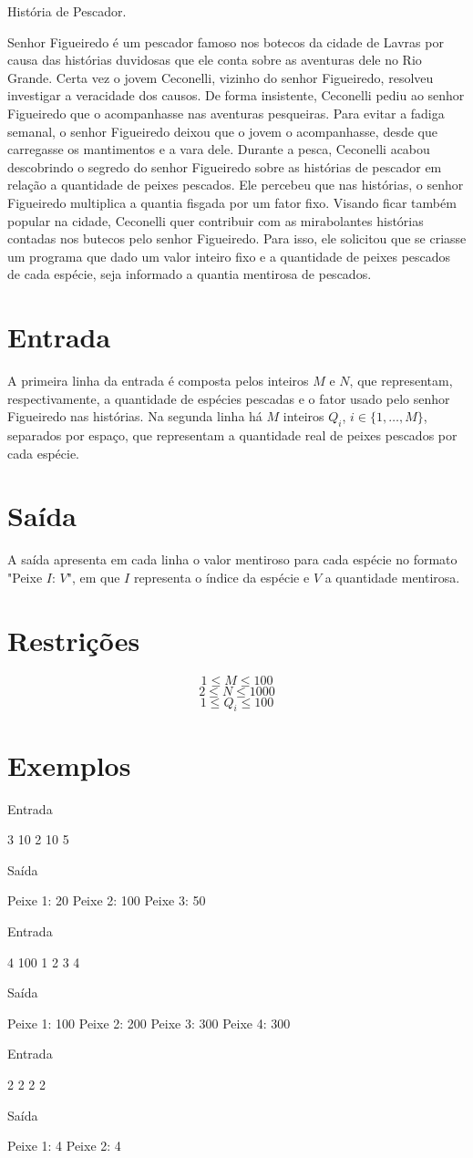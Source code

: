 História de Pescador.

Senhor Figueiredo é um pescador famoso nos botecos da cidade de Lavras por causa das histórias duvidosas que ele conta sobre as aventuras dele no Rio Grande. Certa vez o jovem Ceconelli, vizinho do senhor Figueiredo, resolveu investigar a veracidade dos causos. De forma insistente, Ceconelli pediu ao senhor Figueiredo que o acompanhasse nas aventuras pesqueiras. Para evitar a fadiga semanal, o senhor Figueiredo deixou que o jovem o acompanhasse, desde que carregasse os mantimentos e a vara dele. Durante a pesca, Ceconelli acabou descobrindo o segredo do senhor Figueiredo sobre as histórias de pescador em relação a quantidade de peixes pescados. Ele percebeu que nas histórias, o senhor Figueiredo multiplica a quantia fisgada por um fator fixo. Visando ficar também popular na cidade, Ceconelli quer contribuir com as mirabolantes histórias contadas nos butecos pelo senhor Figueiredo. Para isso, ele solicitou que se criasse um programa que dado um valor inteiro fixo e a quantidade de peixes pescados de cada espécie, seja informado a quantia mentirosa de pescados.

\section*{Entrada}

A primeira linha da entrada é composta pelos inteiros $M$ e $N$, que representam, respectivamente, a quantidade de espécies pescadas e o fator usado pelo senhor Figueiredo nas histórias. Na segunda linha há $M$ inteiros $Q_i$, $i \in \{1, \ldots, M\}$, separados por espaço, que representam a quantidade real de peixes pescados por cada espécie.

\section*{Saída}

A saída apresenta em cada linha o valor mentiroso para cada espécie no formato "Peixe $I$: $V$", em que $I$ representa o índice da espécie e $V$ a quantidade mentirosa.

\section*{Restrições}

$$1 \leq M \leq 100$$
$$2 \leq N \leq 1000$$
$$1 \leq Q_i \leq 100$$


\section*{Exemplos}

Entrada

3 10
2 10 5

Saída

Peixe 1: 20
Peixe 2: 100
Peixe 3: 50


Entrada

4 100
1 2 3 4

Saída

Peixe 1: 100
Peixe 2: 200
Peixe 3: 300
Peixe 4: 300


Entrada

2 2
2 2

Saída

Peixe 1: 4
Peixe 2: 4

\exemplo
